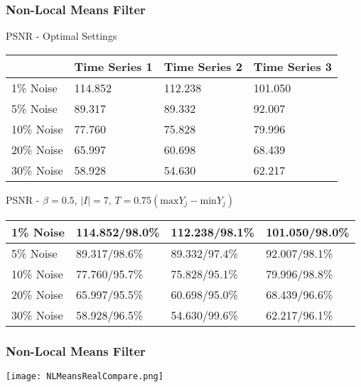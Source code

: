 \documentclass{beamer}
\begin{document}

\begin{frame}
\begin{center}
\frametitle{Non-Local Means Filter}

\small{

PSNR - Optimal Settings

\begin{table}[h]
\begin{tabular}{l | l | l | l}
 & Time Series 1 & Time Series 2 & Time Series 3 \\ \hline
1\% Noise & 114.852 & 112.238 & 101.050 \\ \hline
5\% Noise & 89.317 & 89.332 & 92.007 \\ \hline
10\% Noise & 77.760 & 75.828 & 79.996 \\ \hline
20\% Noise & 65.997 & 60.698 & 68.439 \\ \hline
30\% Noise & 58.928 & 54.630 & 62.217
\end{tabular}
\end{table}

PSNR - $\beta = 0.5$, $\lvert I \rvert = 7$, $T = 0.75 \left( \mathrm{max} Y_j - \mathrm{min} Y_j \right)$

\begin{table}[h]
\begin{tabular}{l | l | l | l}
1\% Noise & 114.852/98.0\% & 112.238/98.1\% & 101.050/98.0\% \\ \hline
5\% Noise & 89.317/98.6\% & 89.332/97.4\% & 92.007/98.1\% \\ \hline
10\% Noise & 77.760/95.7\% & 75.828/95.1\% & 79.996/98.8\% \\ \hline
20\% Noise & 65.997/95.5\% & 60.698/95.0\% & 68.439/96.6\% \\ \hline
30\% Noise & 58.928/96.5\% & 54.630/99.6\% & 62.217/96.1\%
\end{tabular}
\end{table}

}

\end{center}
\end{frame}


\begin{frame}
\begin{center}
\frametitle{Non-Local Means Filter}

\texttt{[image: NLMeansRealCompare.png]}

\end{center}
\end{frame}
\end{document}
